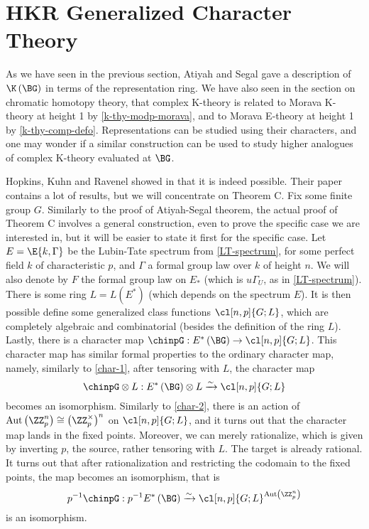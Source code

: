 \section{HKR Generalized Character Theory}

As we have seen in the previous section, Atiyah and Segal gave a description of $\K\left(\BG\right)$ in terms of the representation ring.
We have also seen in the section on chromatic homotopy theory, that complex K-theory is related to Morava K-theory at height 1 by \cref{k-thy-modp-morava}, and to Morava E-theory at height 1 by \cref{k-thy-comp-defo}.
Representations can be studied using their characters, and one may wonder if a similar construction can be used to study higher analogues of complex K-theory evaluated at $\BG$.

Hopkins, Kuhn and Ravenel showed in \cite{HKR} that it is indeed possible.
Their paper contains a lot of results, but we will concentrate on Theorem C.
Fix some finite group $G$.
Similarly to the proof of Atiyah-Segal theorem, the actual proof of Theorem C involves a general construction, even to prove the specific case we are interested in, but it will be easier to state it first for the specific case.
Let $E = \E{k, \Gamma}$ be the Lubin-Tate spectrum from \cref{LT-spectrum}, for some perfect field $k$ of characteristic $p$, and $\Gamma$ a formal group law over $k$ of height $n$.
We will also denote by $F$ the formal group law on $E_*$ (which is $u \Gamma_U$, as in \cref{LT-spectrum}).
There is some ring $L = L\left(E^*\right)$ (which depends on the spectrum $E$).
It is then possible define some generalized class functions $\cl[n,p]{G; L}$, which are completely algebraic and combinatorial (besides the definition of the ring $L$).
Lastly, there is a character map $\chinpG: E^*\left(\BG\right) \to \cl[n,p]{G; L}$.
This character map has similar formal properties to the ordinary character map, namely, similarly to \cref{char-1}, after tensoring with $L$, the character map
$$
\chinpG \otimes L:
E^*\left(\BG\right) \otimes L
\xrightarrow{\sim} \cl[n,p]{G; L}
$$
becomes an isomorphism.
Similarly to \cref{char-2}, there is an action of $\aut\left(\ZZ_p^n\right) \cong \left(\ZZ_p^\times\right)^n$ on $\cl[n,p]{G; L}$, and it turns out that the character map lands in the fixed points.
Moreover, we can merely rationalize, which is given by inverting $p$, the source, rather tensoring with $L$.
The target is already rational.
It turns out that after rationalization and restricting the codomain to the fixed points, the map becomes an isomorphism, that is
$$
p^{-1} \chinpG:
p^{-1} E^*\left(\BG\right)
\xrightarrow{\sim} \cl[n,p]{G; L}^{\aut\left(\ZZ_p^n\right)}
$$
is an isomorphism.

